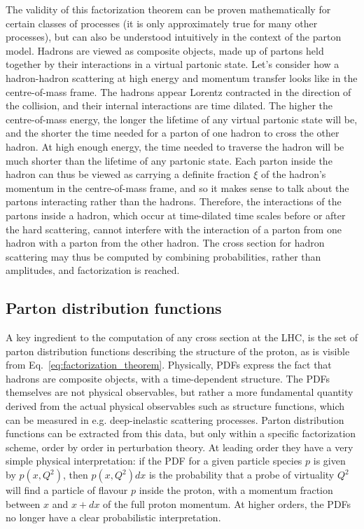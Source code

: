 The validity of this factorization theorem can be proven mathematically for certain classes of
processes (it is only approximately true for many other processes), but can also be understood
intuitively in the context of the parton model. 
Hadrons are viewed as composite objects, made up of partons held together by their interactions in
a virtual partonic state.
Let's consider how a hadron-hadron scattering at high energy and momentum transfer looks like in the
centre-of-mass frame. The hadrons appear Lorentz contracted in the direction of the collision, and
their internal interactions are time dilated. The higher the centre-of-mass energy, the longer the
lifetime of any virtual partonic state will be, and the shorter the time needed for a parton of one
hadron to cross the other hadron. At high enough energy, the time needed to traverse the hadron
will be much shorter than the lifetime of any partonic state. Each parton inside the hadron can
thus be viewed as carrying a definite fraction $\xi$ of the hadron's momentum in the centre-of-mass
frame, and so it makes sense to talk about the partons interacting rather than the hadrons.  
Therefore, the interactions of the partons inside a hadron, which occur at time-dilated time
scales before or after the hard scattering, cannot interfere with the interaction of a parton
from one hadron with a parton from the other hadron. 
The cross section for hadron scattering may thus be computed by
combining probabilities, rather than amplitudes, and factorization is reached. 




\subsection{Parton distribution functions \label{sec:event_pdfs}}

A key ingredient to the computation of any cross section at the LHC, is the set of parton
distribution functions describing the structure of the proton, as
is visible from Eq.~\ref{eq:factorization_theorem}. 
Physically, PDFs express the fact that hadrons are composite objects, with a time-dependent
structure. The PDFs themselves are not physical observables, but rather a more fundamental quantity
derived from the actual physical observables such as structure functions, which can be measured
in e.g. deep-inelastic scattering processes. 
Parton distribution functions can be extracted from this data, but only within a specific
factorization scheme, order by order in perturbation theory. 
At leading order they have a very simple physical interpretation: if the PDF for a given particle
species $p$ is given by $p(x,Q^2)$, then $p(x,Q^2) dx$ is the probability that a probe of
virtuality $Q^2$ will find a particle of flavour $p$ inside the proton, with a
momentum fraction between $x$ and $x + dx$ of the full proton momentum. 
At higher orders, the PDFs no longer have a clear probabilistic interpretation. 


